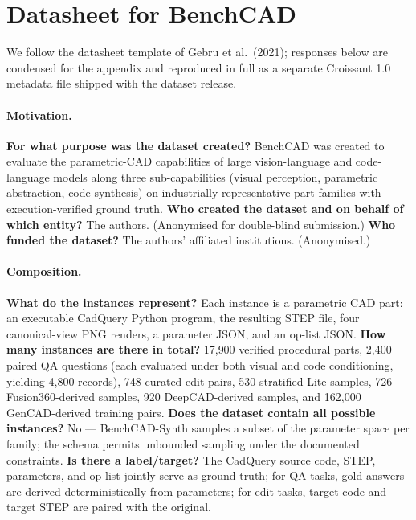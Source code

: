 \documentclass{article}
\begin{document}
\appendix

\section{Datasheet for BenchCAD}
\label{app:datasheet}

We follow the datasheet template of Gebru et al.\ (2021); responses below are condensed for the appendix and reproduced in full as a separate Croissant 1.0 metadata file shipped with the dataset release.

\paragraph{Motivation.}
\textbf{For what purpose was the dataset created?} BenchCAD was created to evaluate the parametric-CAD capabilities of large vision-language and code-language models along three sub-capabilities (visual perception, parametric abstraction, code synthesis) on industrially representative part families with execution-verified ground truth.
\textbf{Who created the dataset and on behalf of which entity?} The authors. (Anonymised for double-blind submission.)
\textbf{Who funded the dataset?} The authors' affiliated institutions. (Anonymised.)

\paragraph{Composition.}
\textbf{What do the instances represent?} Each instance is a parametric CAD part: an executable CadQuery Python program, the resulting STEP file, four canonical-view PNG renders, a parameter JSON, and an op-list JSON. \textbf{How many instances are there in total?} 17{,}900 verified procedural parts, 2{,}400 paired QA questions (each evaluated under both visual and code conditioning, yielding 4{,}800 records), 748 curated edit pairs, 530 stratified Lite samples, 726 Fusion360-derived samples, 920 DeepCAD-derived samples, and 162{,}000 GenCAD-derived training pairs. \textbf{Does the dataset contain all possible instances?} No --- BenchCAD-Synth samples a subset of the parameter space per family; the schema permits unbounded sampling under the documented constraints. \textbf{Is there a label/target?} The CadQuery source code, STEP, parameters, and op list jointly serve as ground truth; for QA tasks, gold answers are derived deterministically from parameters; for edit tasks, target code and target STEP are paired with the original.
\end{document}
